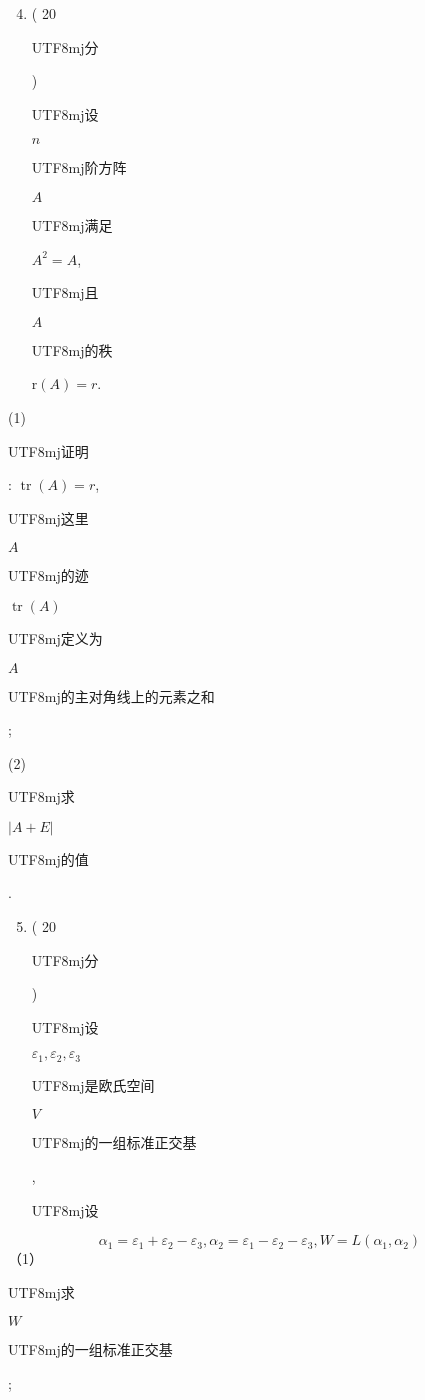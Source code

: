 \documentclass[10pt]{article}
\begin{document}
\begin{enumerate}
  \setcounter{enumi}{3}
  \item ( 20 \begin{CJK}{UTF8}{mj}分\end{CJK}) \begin{CJK}{UTF8}{mj}设\end{CJK} $n$ \begin{CJK}{UTF8}{mj}阶方阵\end{CJK} $A$ \begin{CJK}{UTF8}{mj}满足\end{CJK} $A^{2}=A$, \begin{CJK}{UTF8}{mj}且\end{CJK} $A$ \begin{CJK}{UTF8}{mj}的秩\end{CJK} $\mathrm{r}(A)=r$.
\end{enumerate}
(1) \begin{CJK}{UTF8}{mj}证明\end{CJK}: $\operatorname{tr}(A)=r$, \begin{CJK}{UTF8}{mj}这里\end{CJK} $A$ \begin{CJK}{UTF8}{mj}的迹\end{CJK} $\operatorname{tr}(A)$ \begin{CJK}{UTF8}{mj}定义为\end{CJK} $A$ \begin{CJK}{UTF8}{mj}的主对角线上的元素之和\end{CJK};

(2) \begin{CJK}{UTF8}{mj}求\end{CJK} $|A+E|$ \begin{CJK}{UTF8}{mj}的值\end{CJK}.

\begin{enumerate}
  \setcounter{enumi}{4}
  \item ( 20 \begin{CJK}{UTF8}{mj}分\end{CJK}) \begin{CJK}{UTF8}{mj}设\end{CJK} $\varepsilon_{1}, \varepsilon_{2}, \varepsilon_{3}$ \begin{CJK}{UTF8}{mj}是欧氏空间\end{CJK} $V$ \begin{CJK}{UTF8}{mj}的一组标准正交基\end{CJK}, \begin{CJK}{UTF8}{mj}设\end{CJK}
\end{enumerate}
$$
\alpha_{1}=\varepsilon_{1}+\varepsilon_{2}-\varepsilon_{3}, \alpha_{2}=\varepsilon_{1}-\varepsilon_{2}-\varepsilon_{3}, W=L\left(\alpha_{1}, \alpha_{2}\right)
$$
（1）\begin{CJK}{UTF8}{mj}求\end{CJK} $W$ \begin{CJK}{UTF8}{mj}的一组标准正交基\end{CJK};
\end{document}
